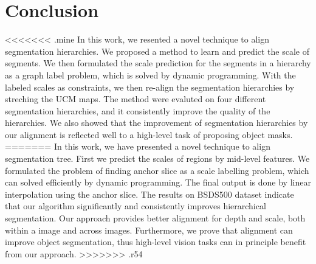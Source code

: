 \section{Conclusion}

<<<<<<< .mine
In this work, we resented a novel technique to align segmentation
hierarchies. We proposed a method to learn and predict the scale of
segments. We then formulated the scale prediction for the segments in
a hierarchy as a graph label problem, which is solved by dynamic
programming. With the labeled scales as constraints, we then re-align
the segmentation hierarchies by streching the UCM maps.  The method
were evaluted on four different segmentation hierarchies, and it
consistently improve the quality of the hierarchies.  We also showed
that the improvement of segmentation hierarchies by our alignment is
reflected well to a high-level task of proposing object masks.
=======
In this work, we have presented a novel technique to align segmentation tree. First we predict the scales of regions by mid-level features. We formulated the problem of finding anchor slice as a scale labelling problem, which can solved efficiently by dynamic programming. The final output is done by linear interpolation using the anchor slice. The results on BSDS500 dataset indicate that our algorithm significantly and consistently improves hierarchical segmentation. Our approach provides better alignment for depth and scale, both within a image and across images. Furthermore, we prove that alignment can improve object segmentation, thus high-level vision tasks can in principle benefit from our approach.
>>>>>>> .r54

